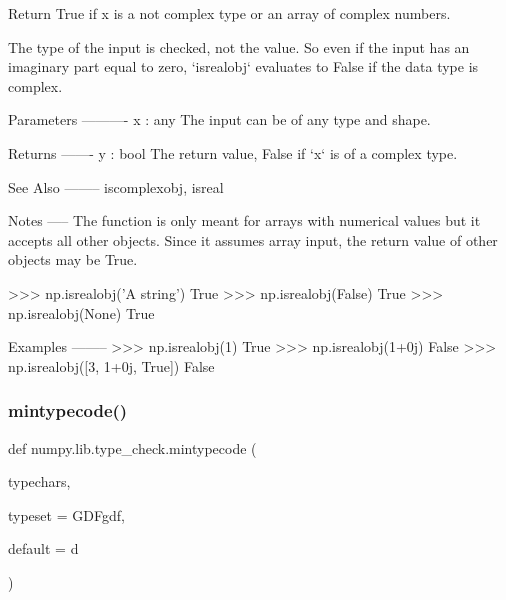 \begin{DoxyVerb}Return True if x is a not complex type or an array of complex numbers.

The type of the input is checked, not the value. So even if the input
has an imaginary part equal to zero, `isrealobj` evaluates to False
if the data type is complex.

Parameters
----------
x : any
    The input can be of any type and shape.

Returns
-------
y : bool
    The return value, False if `x` is of a complex type.

See Also
--------
iscomplexobj, isreal

Notes
-----
The function is only meant for arrays with numerical values but it
accepts all other objects. Since it assumes array input, the return
value of other objects may be True.

>>> np.isrealobj('A string')
True
>>> np.isrealobj(False)
True
>>> np.isrealobj(None)
True

Examples
--------
>>> np.isrealobj(1)
True
>>> np.isrealobj(1+0j)
False
>>> np.isrealobj([3, 1+0j, True])
False\end{DoxyVerb}
 \mbox{\label{namespacenumpy_1_1lib_1_1type__check_ac66550f4eed168c89e7b137be8aa0e24}} 
\subsubsection{\texorpdfstring{mintypecode()}{mintypecode()}}
{\footnotesize\ttfamily def numpy.\+lib.\+type\+\_\+check.\+mintypecode (\begin{DoxyParamCaption}\item[{}]{typechars,  }\item[{}]{typeset = {\ttfamily \textquotesingle{}GDFgdf\textquotesingle{}},  }\item[{}]{default = {\ttfamily \textquotesingle{}d\textquotesingle{}} }\end{DoxyParamCaption})}

